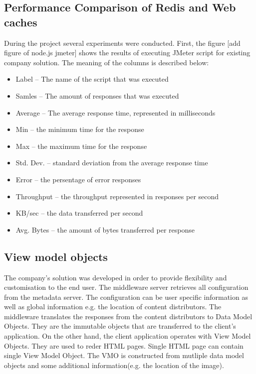 \subsection{Performance Comparison of Redis and Web caches}


During the project several experiments were conducted. First, the figure [add figure of node.js jmeter] shows the results of executing JMeter script for existing company solution. The meaning of the columns is described below: 

\begin{itemize}
	\item Label  -- The name of the script that was executed
	\item Samles -- The amount of responses that was executed
	\item Average -- The average response time, represented in milliseconds
	\item Min -- the minimum time for the response 
	\item Max -- the maximum time for the response
	\item Std. Dev.  -- standard deviation from the average response time
	\item Error -- the persentage of error responses
	\item Throughput -- the throughput represented in responses per second
	\item KB/sec -- the data transferred per second
	\item Avg. Bytes -- the amount of bytes transferred per response
\end{itemize}

\subsection{View model objects}

The company's solution was developed in order to provide flexibility and customisation to the end user. The middleware server retrieves all configuration from the metadata server. The configuration can be user specific information as well as global information e.g. the location of content distributors. The middleware translates the responses from the content distributors to Data Model Objects. They are the immutable objects that are transferred to the client's application. On the other hand, the client application operates with View Model Objects. They are used to reder HTML pages. Single HTML page can contain single View Model Object. The VMO is constructed from mutliple data model objects and some additional information(e.g. the location of the image).   

